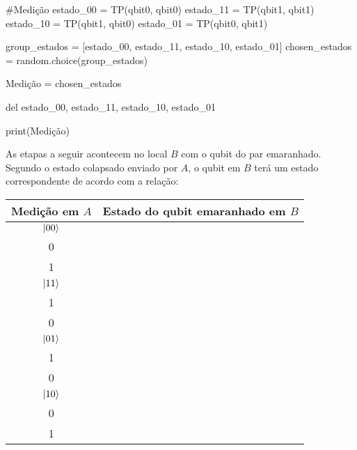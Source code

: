 \begin{pycode}
    #Medição
    estado_00 = TP(qbit0, qbit0)
    estado_11 = TP(qbit1, qbit1)
    estado_10 = TP(qbit1, qbit0)
    estado_01 = TP(qbit0, qbit1)

    group_estados = [estado_00, estado_11, estado_10, estado_01]
    chosen_estados = random.choice(group_estados)

    Medição = chosen_estados

    del estado_00, estado_11, estado_10, estado_01

    print(Medição)
\end{pycode}

As etapas a seguir acontecem no local \(B\) com o qubit do par emaranhado. Segundo o estado colapsado enviado por \(A\), o qubit em \(B\) terá um estado correspondente de acordo com a relação:
\begin{center}
  \begin{tabular}{cc}
    \toprule
    Medição em \(A\) & Estado do qubit emaranhado em \(B\) \\
    \midrule
    \(\ket{00}\) & \(\alpha \begin{bmatrix} 1 \\ 0 \end{bmatrix} + \beta \begin{bmatrix} 0 \\ 1 \end{bmatrix}\) \\
    \(\ket{11}\) & \(\alpha \begin{bmatrix} 0 \\ 1 \end{bmatrix} - \beta \begin{bmatrix} 1 \\ 0 \end{bmatrix}\) \\
    \(\ket{01}\) & \(\alpha \begin{bmatrix} 0 \\ 1 \end{bmatrix} + \beta \begin{bmatrix} 1 \\ 0 \end{bmatrix}\) \\
    \(\ket{10}\) & \(\alpha \begin{bmatrix} 1 \\ 0 \end{bmatrix} - \beta \begin{bmatrix} 0 \\ 1 \end{bmatrix}\) \\
    \bottomrule
  \end{tabular}
\end{center}

